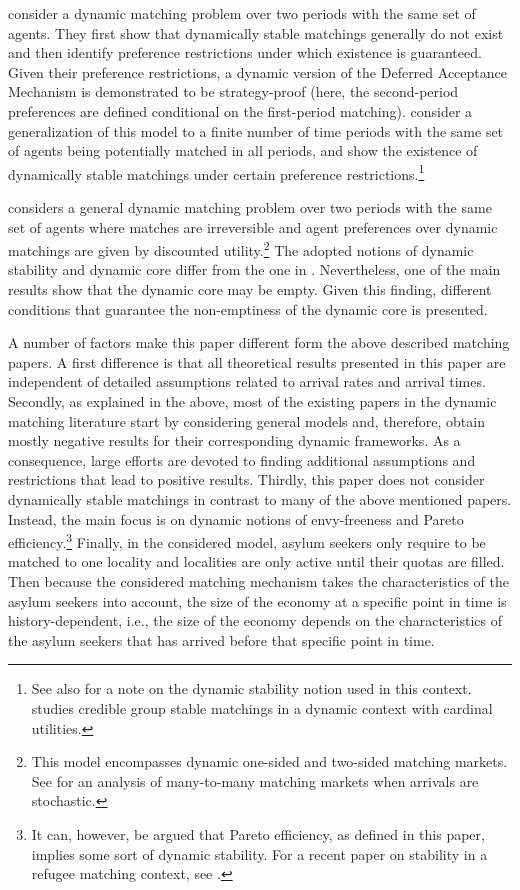 \documentclass[12pt,fleqn]{article}
\begin{document}
\citet{bib:KadamEtAl2018a} consider a dynamic matching problem over two periods with the same set of agents. They first show that dynamically stable matchings generally do not exist and then identify preference restrictions under which existence is guaranteed. Given their preference restrictions, a dynamic version of the Deferred Acceptance Mechanism is demonstrated to be strategy-proof (here, the second-period preferences are defined conditional on the first-period matching). \citet{bib:KadamEtAl2018b} consider a generalization of this model to a finite number of time periods with the same set of agents being potentially matched in all periods, and show the existence of dynamically stable matchings under certain preference restrictions.\footnote{See also \citet{bib:Kotowski} for a note on the dynamic stability notion used in this context. \citet{bib:Kurino} studies credible group stable matchings in a dynamic context with cardinal utilities.}

\citet{bib:Doval2017} considers a general dynamic matching problem over two periods with the same set of agents where matches are irreversible and agent preferences over dynamic matchings are given by discounted utility.\footnote{This model encompasses dynamic one-sided and two-sided matching markets. See \citet{bib:Doval2016} for an analysis of many-to-many matching markets when arrivals are stochastic.} The adopted notions of dynamic stability and dynamic core differ from the one in \citet{bib:KadamEtAl2018a,bib:KadamEtAl2018b}. Nevertheless, one of the main results show that the dynamic core may be empty. Given this finding, different conditions that guarantee the non-emptiness of the dynamic core is presented.

A number of factors make this paper different form the above described matching papers. A first difference is that all theoretical results presented in this paper are independent of detailed assumptions related to arrival rates and arrival times. Secondly, as explained in the above, most of the existing papers in the dynamic matching literature start by considering general models and, therefore, obtain mostly negative results for their corresponding dynamic frameworks. As a consequence, large efforts are devoted to finding additional assumptions and restrictions that lead to positive results. Thirdly, this paper does not consider dynamically stable matchings in contrast to many of the above mentioned papers. Instead, the main focus is on dynamic notions of envy-freeness and Pareto efficiency.\footnote{It can, however, be argued that Pareto efficiency, as defined in this paper, implies some sort of dynamic stability. For a recent paper on stability in a refugee matching context, see \citet{bib:AzizEtAl2017}.} Finally, in the considered model, asylum seekers only require to be matched to one locality and localities are only active until their quotas are filled. Then because the considered matching mechanism takes the characteristics of the asylum seekers into account, the size of the economy at a specific point in time is history-dependent, i.e., the size of the economy depends on the characteristics of the asylum seekers that has arrived before that specific point in time.
\end{document}

